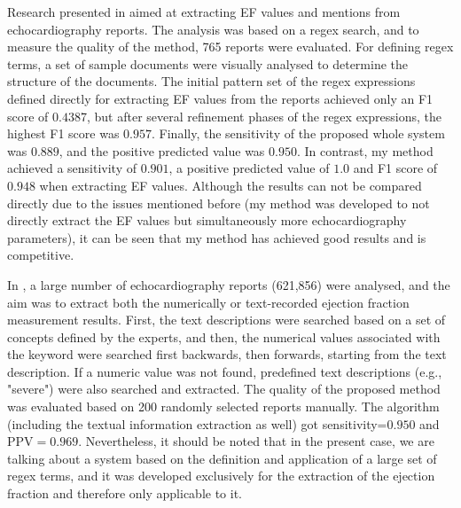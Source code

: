 Research presented in \cite{garvin2012automated} aimed at extracting EF values and mentions from echocardiography reports. The analysis was based on a regex search, and to measure the quality of the method, 765 reports were evaluated. For defining regex terms, a set of sample documents were visually analysed to determine the structure of the documents. The initial pattern set of the regex expressions defined directly for extracting EF values from the reports achieved only an F1 score of $0.438$7, but after several refinement phases of the regex expressions, the highest F1 score was $0.957$. Finally, the sensitivity of the proposed whole system was $0.889$, and the positive predicted value was $0.950$. In contrast, my method achieved a sensitivity of $0.901$, a positive predicted value of $1.0$ and F1 score of $0.948$ when extracting EF values. Although the results can not be compared directly due to the issues mentioned before (my method was developed to not directly extract the EF values but simultaneously more echocardiography parameters), it can be seen that my method has achieved good results and is competitive.

In \cite{xie2017extracting}, a large number of echocardiography reports (621,856) were analysed, and the aim was to extract both the numerically or text-recorded ejection fraction measurement results. First, the text descriptions were searched based on a set of concepts defined by the experts, and then, the numerical values associated with the keyword were searched first backwards, then forwards, starting from the text description. If a numeric value was not found, predefined text descriptions (e.g., "severe") were also searched and extracted. The quality of the proposed method was evaluated based on 200 randomly selected reports manually. The algorithm (including the textual information extraction as well) got sensitivity=$0.950$ and PPV$=0.969$. Nevertheless, it should be noted that in the present case, we are talking about a system based on the definition and application of a large set of regex terms, and it was developed exclusively for the extraction of the ejection fraction and therefore only applicable to it. 

